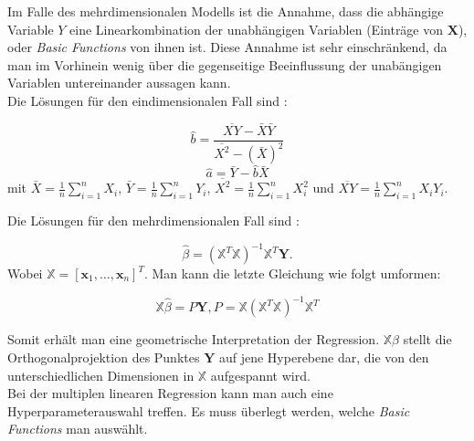 Im Falle des mehrdimensionalen Modells ist die Annahme, dass die \glqq abh\"angige\grqq{} Variable $Y$ eine Linearkombination der \glqq unabh\"angigen\grqq{} Variablen
(Eintr\"age von $\mathbf{X}$), oder \textit{Basic Functions} von ihnen ist. Diese Annahme ist sehr einschr\"ankend, da man im Vorhinein wenig \"uber die gegenseitige Beeinflussung der 
\glqq unab\"angigen\grqq{} Variablen untereinander aussagen kann. \\

Die L\"osungen f\"ur den eindimensionalen Fall sind \cite[Kapitel 13, Satz 13.4]{wasserman}:

$$ \hat{b} = \frac{\overline{XY} - \bar{X}\bar{Y}}{\overline{X^2} - (\bar{X})^2} $$
$$ \hat{a} = \bar{Y} - \hat{b}\bar{X} $$
mit $\bar{X} = \frac{1}{n} \sum_{i = 1}^n X_i$, $\bar{Y} = \frac{1}{n} \sum_{i = 1}^n Y_i$, $\overline{X^2} = \frac{1}{n} \sum_{i = 1}^n X_i^2$ und $\overline{XY} = \frac{1}{n} \sum_{i = 1}^n X_iY_i$.

Die L\"osungen f\"ur den mehrdimensionalen Fall sind \cite[Kapitel 13, Satz 13.13]{wasserman}: 

$$  \hat{\beta} = (\mathbb{X}^T\mathbb{X})^{-1}\mathbb{X}^T\mathbf{Y} .$$
Wobei $\mathbb{X} = [\mathbf{x}_1, \dots, \mathbf{x}_n]^T$. Man kann die letzte Gleichung wie folgt umformen:

$$ \mathbb{X}\hat{\beta} = P\mathbf{Y}, P = \mathbb{X}(\mathbb{X}^T\mathbb{X})^{-1}\mathbb{X}^T $$

Somit erh\"alt man eine geometrische Interpretation der Regression. $\mathbb{X}\hat{\beta}$ stellt die Orthogonalprojektion des Punktes $\mathbf{Y}$ auf jene
Hyperebene dar, die von den unterschiedlichen Dimensionen in $\mathbb{X}$ aufgespannt wird. \\

Bei der multiplen linearen Regression kann man auch eine Hyperparameterauswahl treffen. Es muss \"uberlegt werden, welche 
\textit{Basic Functions} man ausw\"ahlt. 






























